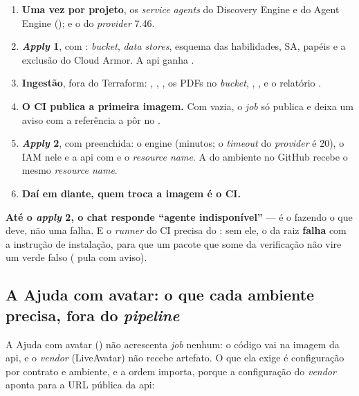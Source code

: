 \begin{enumerate}
  \item \textbf{Uma vez por projeto}, os \emph{service agents} do Discovery Engine
    e do Agent Engine (); e o
     do \emph{provider}  7.46.
  \item \textbf{\emph{Apply} 1}, com :
    \emph{bucket}, \emph{data stores}, esquema das habilidades, SA, papéis e a
    exclusão do Cloud Armor. A api ganha .
  \item \textbf{Ingestão}, fora do Terraform: ,
    , , os PDFs no
    \emph{bucket}, , ,
     e o relatório .
  \item \textbf{O CI publica a primeira imagem.} Com
     vazia, o \emph{job} só publica e deixa um
    aviso com a referência a pôr no .
  \item \textbf{\emph{Apply} 2}, com  preenchida:
    o engine (minutos; o \emph{timeout} do \emph{provider} é 20), o IAM nele e a
    api com  e o \emph{resource name}.
    A   do ambiente no GitHub recebe o
    mesmo \emph{resource name}.
  \item \textbf{Daí em diante, quem troca a imagem é o CI.}
\end{enumerate}

\begin{atencao}
\textbf{Até o \emph{apply} 2, o chat responde \enquote{agente indisponível}} ---
é o  fazendo o que deve, não uma falha. E o \emph{runner} do CI
precisa do : sem ele, o  da raiz \textbf{falha} com a
instrução de instalação, para que um pacote que some da verificação não vire um
verde falso ( pula com aviso).
\end{atencao}

\subsection{A Ajuda com avatar: o que cada ambiente precisa, fora do \emph{pipeline}}

A Ajuda com avatar () não acrescenta \emph{job} nenhum: o código vai
na imagem da api, e o \emph{vendor} (LiveAvatar) não recebe artefato. O que ela
exige é configuração por contrato e ambiente, e a ordem importa, porque a
configuração do \emph{vendor} aponta para a URL pública da api:

